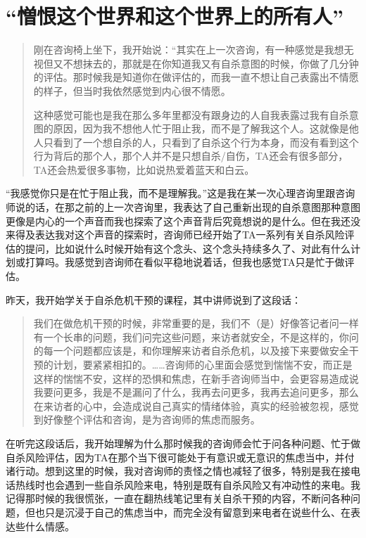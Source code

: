 \chapter{“憎恨这个世界和这个世界上的所有人”}



\blockquote{
	刚在咨询椅上坐下，我开始说：“其实在上一次咨询，有一种感觉是我想无视但又不想抹去的，那就是在你知道我又有自杀意图的时候，你做了几分钟的评估。那时候我是知道你在做评估的，而我一直不想让自己表露出不情愿的样子，但当时我依然感觉到内心很不情愿。

	这种感觉可能也是我在那么多年里都没有跟身边的人自我表露过我有自杀意图的原因，因为我不想他人忙于阻止我，而不是了解我这个人。这就像是他人只看到了一个想自杀的人，只看到了自杀这个行为本身，而没有看到这个行为背后的那个人，那个人并不是只想自杀/自伤，TA还会有很多部分，TA还会热爱很多事物，比如说热爱着蓝天和白云。

}

“我感觉你只是在忙于阻止我，而不是理解我。”这是我在某一次心理咨询里跟咨询师说的话，在那之前的上一次咨询里，我表达了自己重新出现的自杀意图\pozhehao{}那种意图更像是内心的一个声音\pozhehao{}而我也探索了这个声音背后究竟想说的是什么。但在我还没来得及表达我对这个声音的探索时，咨询师已经开始了TA一系列有关自杀风险评估的提问，比如说什么时候开始有这个念头、这个念头持续多久了、对此有什么计划或打算吗。我感觉到咨询师在看似平稳地说着话，但我也感觉TA只是忙于做评估。

昨天，我开始学关于自杀危机干预的课程，其中讲师说到了这段话：

\blockquote{
	我们在做危机干预的时候，非常重要的是，我们不（是）好像答记者问一样有一个长串的问题，我们问完这些问题，来访者就安全，不是这样的，你问的每一个问题都应该是，和你理解来访者自杀危机，以及接下来要做安全干预的计划，要紧紧相扣的。……咨询师的心里面会感觉到惴惴不安，而正是这样的惴惴不安，这样的恐惧和焦虑，在新手咨询师当中，会更容易造成说我要问更多，我是不是漏问了什么，我再去问更多，我再去追问更多，那么在来访者的心中，会造成说自己真实的情绪体验，真实的经验被忽视，感觉到好像整个评估和咨询，是为咨询师的焦虑而服务。
}
在听完这段话后，我开始理解为什么那时候我的咨询师会忙于问各种问题、忙于做自杀风险评估，因为TA在那个当下很可能处于有意识或无意识的焦虑当中，并付诸行动。想到这里的时候，我对咨询师的责怪之情也减轻了很多，特别是我在接电话热线时也会遇到一些自杀风险来电，特别是既有自杀风险又有冲动性的来电。我记得那时候的我很慌张，一直在翻热线笔记里有关自杀干预的内容，不断问各种问题，但也只是沉浸于自己的焦虑当中，而完全没有留意到来电者在说些什么、在表达些什么情感。

